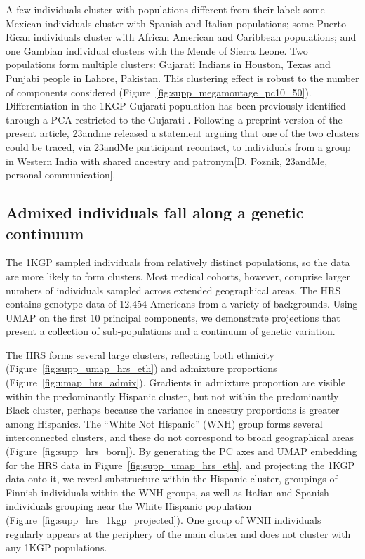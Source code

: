 A few individuals cluster with populations different from their label: some Mexican individuals cluster with Spanish and Italian populations; some Puerto Rican individuals cluster with African American and Caribbean populations; and one Gambian individual clusters with the Mende of Sierra Leone. Two populations form multiple clusters: Gujarati Indians in Houston, Texas and Punjabi people in Lahore, Pakistan. This clustering effect is robust to the number of components considered (Figure~\ref{fig:supp_megamontage_pc10_50}). Differentiation in the 1KGP Gujarati population has been previously identified through a PCA restricted to the Gujarati \citep{reich2009india}. Following a preprint version of the present article, 23andme released a statement \citep{23andme} arguing that one of the two clusters could be traced, via 23andMe participant recontact, to individuals from a group in Western India with shared ancestry and patronym[D. Poznik, 23andMe, personal communication]\citep{23andme}.

\subsection{Admixed individuals fall along a genetic continuum}
The 1KGP sampled individuals from relatively distinct populations, so the data are more likely to form clusters. Most medical cohorts, however, comprise larger numbers of individuals sampled across extended geographical areas. The HRS contains genotype data of 12,454 Americans from a variety of backgrounds. Using UMAP on the first 10 principal components, we demonstrate projections that present a collection of sub-populations and a continuum of genetic variation.

The HRS forms several large clusters, reflecting both ethnicity (Figure~\ref{fig:supp_umap_hrs_eth}) and admixture proportions (Figure~\ref{fig:umap_hrs_admix}). Gradients in admixture proportion are visible within the predominantly Hispanic cluster, but not within the predominantly Black cluster, perhaps because the variance in ancestry proportions is greater among Hispanics. The ``White Not Hispanic'' (WNH) group forms several interconnected clusters, and these do not correspond to broad geographical areas (Figure~\ref{fig:supp_hrs_born}). By generating the PC axes and UMAP embedding for the HRS data in Figure~\ref{fig:supp_umap_hrs_eth}, and projecting the 1KGP data onto it, we reveal substructure within the Hispanic cluster, groupings of Finnish individuals within the WNH groups, as well as Italian and Spanish individuals grouping near the White Hispanic population (Figure~\ref{fig:supp_hrs_1kgp_projected}). One group of WNH individuals regularly appears at the periphery of the main cluster and does not cluster with any 1KGP populations.

